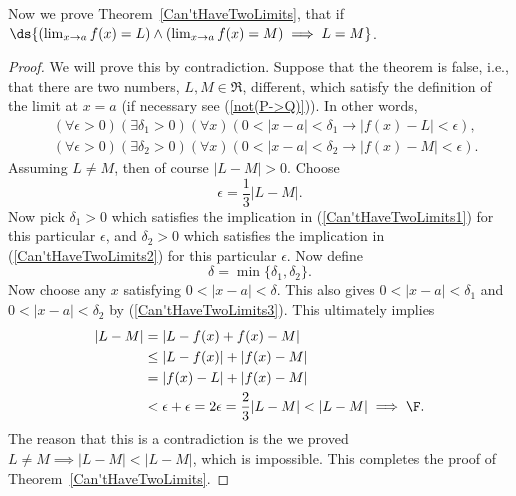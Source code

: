 Now we prove Theorem~\ref{Can'tHaveTwoLimits}, that
if $\ds{\left(\lim_{x\to a}f(x)=L\right)
\wedge\left(\lim_{x\to a}f(x)=M\right)\implies L=M}$.

\begin{proof} We will prove this by contradiction.  Suppose
that the theorem is false, i.e., that there are two numbers,
$L,M\in\Re$, different, which satisfy the definition
of the limit at $x=a$ (if necessary see (\ref{not(P->Q)})).  
In other words,
\begin{align}
&(\forall \epsilon>0)(\exists \delta_1>0)(\forall x)
\left(0<|x-a|<\delta_1\longrightarrow|f(x)-L|<\epsilon\right),
\label{Can'tHaveTwoLimits1}\\
&(\forall \epsilon>0)(\exists \delta_2>0)(\forall x)
\left(0<|x-a|<\delta_2\longrightarrow|f(x)-M|<\epsilon\right).
\label{Can'tHaveTwoLimits2}\end{align}
Assuming $L\ne M$, then of course $|L-M|>0$.
Choose
\begin{equation}\epsilon=\frac13|L-M|.
  \label{EpsilonChoiceForUniquenssOfLimitProof}\end{equation}
Now pick $\delta_1>0$ which satisfies the implication
in (\ref{Can'tHaveTwoLimits1}) for this particular $\epsilon$,
and $\delta_2>0$ which satisfies the implication in 
(\ref{Can'tHaveTwoLimits2}) for this particular $\epsilon$.
Now define
\begin{equation}\delta=\min\{\delta_1,\delta_2\}.
\label{Can'tHaveTwoLimits3}\end{equation}
Now choose any $x$ satisfying 
$0<|x-a|<\delta$.  This also gives $0<|x-a|<\delta_1$
and $0<|x-a|<\delta_2$ by (\ref{Can'tHaveTwoLimits3}).
This ultimately implies 
\begin{align*}|L-M|&=|L-f(x)+f(x)-M|\\
&\le|L-f(x)|+|f(x)-M|\\
&=|f(x)-L|+|f(x)-M|\\
&< \epsilon+\epsilon=2\epsilon=\frac23|L-M|<|L-M|\implies\F.\end{align*}
The reason that this is a contradiction is the we
proved $L\ne M\implies |L-M|<|L-M|$, which is impossible.\footnotemark
{}
This completes the proof of Theorem~\ref{Can'tHaveTwoLimits}.
\end{proof}

